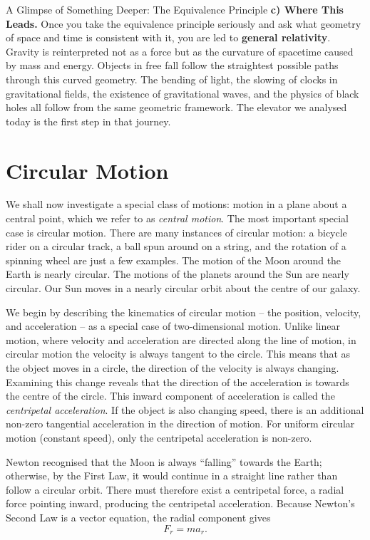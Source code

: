 \begin{supplementary}{A Glimpse of Something Deeper: The Equivalence Principle}
\textbf{c) Where This Leads.} Once you take the equivalence principle seriously and ask what
geometry of space and time is consistent with it, you are led to \textbf{general relativity}.
Gravity is reinterpreted not as a force but as the curvature of spacetime caused by mass and
energy. Objects in free fall follow the straightest possible paths through this curved geometry.
The bending of light, the slowing of clocks in gravitational fields, the existence of
gravitational waves, and the physics of black holes all follow from the same geometric
framework. The elevator we analysed today is the first step in that journey.
\end{supplementary}







\newpage
\section{Circular Motion}

We shall now investigate a special class of motions: motion in a plane about a central point, which we refer to as \textit{central motion}. The most important special case is circular motion. There are many instances of circular motion: a bicycle rider on a circular track, a ball spun around on a string, and the rotation of a spinning wheel are just a few examples. The motion of the Moon around the Earth is nearly circular. The motions of the planets around the Sun are nearly circular. Our Sun moves in a nearly circular orbit about the centre of our galaxy.

We begin by describing the kinematics of circular motion -- the position, velocity, and acceleration -- as a special case of two-dimensional motion. Unlike linear motion, where velocity and acceleration are directed along the line of motion, in circular motion the velocity is always tangent to the circle. This means that as the object moves in a circle, the direction of the velocity is always changing. Examining this change reveals that the direction of the acceleration is towards the centre of the circle. This inward component of acceleration is called the \textit{centripetal acceleration}. If the object is also changing speed, there is an additional non-zero tangential acceleration in the direction of motion. For uniform circular motion (constant speed), only the centripetal acceleration is non-zero.

Newton recognised that the Moon is always ``falling'' towards the Earth; otherwise, by the First Law, it would continue in a straight line rather than follow a circular orbit. There must therefore exist a centripetal force, a radial force pointing inward, producing the centripetal acceleration. Because Newton's Second Law is a vector equation, the radial component gives
\begin{equation}
    F_r = m a_r.
\end{equation}

